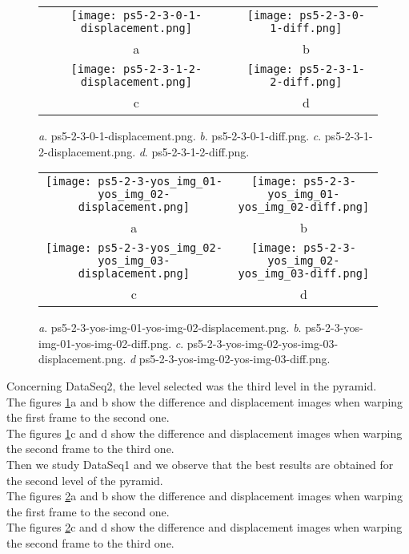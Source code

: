 \documentclass[a4paper,11pt]{article}
\begin{document}
\begin{figure}[H]
\begin{center}
\begin{tabular}{cc}
	\texttt{[image: ps5-2-3-0-1-displacement.png]}&
	\texttt{[image: ps5-2-3-0-1-diff.png]}\\
	a&b\\
	\texttt{[image: ps5-2-3-1-2-displacement.png]}&
	\texttt{[image: ps5-2-3-1-2-diff.png]}\\
	c&d
\end{tabular}
\end{center}
\caption{ 
\textit{a}. ps5-2-3-0-1-displacement.png.  \textit{b}. ps5-2-3-0-1-diff.png. \textit{c}. ps5-2-3-1-2-displacement.png.  \textit{d}. ps5-2-3-1-2-diff.png. }
\label{ps-5-5-a}
\end{figure}



\begin{figure}[H]
\begin{center}
\begin{tabular}{cc}
	\texttt{[image: ps5-2-3-yos\_img\_01-yos\_img\_02-displacement.png]}&
	\texttt{[image: ps5-2-3-yos\_img\_01-yos\_img\_02-diff.png]}\\
	a&b\\
	\texttt{[image: ps5-2-3-yos\_img\_02-yos\_img\_03-displacement.png]}&
	\texttt{[image: ps5-2-3-yos\_img\_02-yos\_img\_03-diff.png]}\\
	c&d
\end{tabular}
\end{center}
\caption{ 
\textit{a}. ps5-2-3-yos-img-01-yos-img-02-displacement.png.  \textit{b}. ps5-2-3-yos-img-01-yos-img-02-diff.png. \textit{c}. ps5-2-3-yos-img-02-yos-img-03-displacement.png.  \textit{d} ps5-2-3-yos-img-02-yos-img-03-diff.png. }
\label{ps-5-5-b}
\end{figure}


Concerning DataSeq2, the level selected was the third level in the pyramid. \\
The figures \ref{ps-5-5-a}a and b show the difference and displacement images when warping the first frame to the second one.\\
The figures \ref{ps-5-5-a}c and d show the difference and displacement images when warping the second frame to the third one.\\

Then we study DataSeq1 and we observe that the best results are obtained for the second level of the pyramid.\\
The figures \ref{ps-5-5-b}a and b show the difference and displacement images when warping the first frame to the second one.\\
The figures \ref{ps-5-5-b}c and d show the difference and displacement images when warping the second frame to the third one.\\
\end{document}
